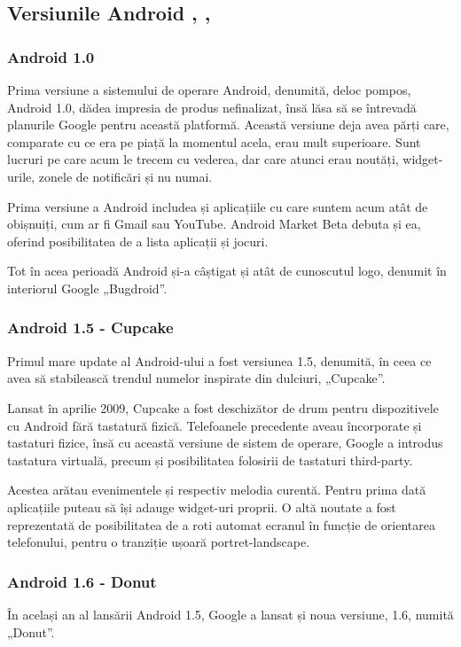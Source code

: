 \documentclass[12pt,a4paper]{article}
\begin{document}
\subsection{Versiunile Android \cite{AndroidVersionsHistory}, \cite{AndroidHistory}, \cite{DeveloperAndroid}}
\subsubsection{Android 1.0}
Prima versiune a sistemului de operare Android, denumită, deloc pompos, Android 1.0, dădea impresia de produs nefinalizat, însă lăsa să se întrevadă planurile Google pentru această platformă. Această versiune deja avea părți care, comparate cu ce era  pe piață la momentul acela, erau mult superioare. Sunt lucruri pe care acum le trecem cu vederea, dar care atunci erau noutăți, widget-urile, zonele de notificări și nu numai. 

Prima versiune a Android includea și aplicațiile cu care suntem acum atât de obișnuiți, cum ar fi Gmail sau YouTube. Android Market Beta debuta și ea, oferind posibilitatea de a lista aplicații și jocuri.

Tot în acea perioadă Android și-a câștigat și atât de cunoscutul logo, denumit în interiorul Google „Bugdroid”.


\subsubsection{Android 1.5 - Cupcake}
Primul mare update al Android-ului a fost versiunea 1.5, denumită, în ceea ce avea să stabilească trendul numelor inspirate din dulciuri, „Cupcake”.

	Lansat în aprilie 2009, Cupcake a fost deschizător de drum pentru dispozitivele cu Android fără tastatură fizică. Telefoanele precedente aveau încorporate și tastaturi fizice, însă cu această versiune de sistem de operare, Google a introdus tastatura virtuală, precum și posibilitatea folosirii de tastaturi third-party.

	Acestea arătau evenimentele și respectiv melodia curentă. Pentru prima dată aplicațiile puteau să își adauge widget-uri proprii. O altă noutate a fost reprezentată de posibilitatea de a roti automat ecranul în funcție de orientarea telefonului, pentru o tranziție ușoară portret-landscape.


\subsubsection{Android 1.6 - Donut}
În același an al lansării Android 1.5, Google a lansat și noua versiune, 1.6, numită „Donut”.
	
\end{document}
